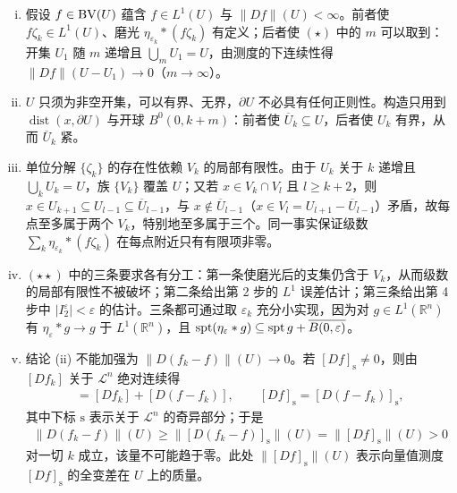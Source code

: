 \documentclass[../../main.tex]{subfiles}%
\begin{document}
\begin{remark}\label{remark:ch05-thm-5-3-条件}
\begin{enumerate}[(i)]
\item 假设 $f\in\mathrm{BV}(U)$ 蕴含 $f\in L^1(U)$ 与 $\lVert Df\rVert(U)<\infty$。前者使 $f\zeta_k\in L^1(U)$、磨光 $\eta_{\varepsilon_k}*(f\zeta_k)$ 有定义；后者使 $(\star)$ 中的 $m$ 可以取到：开集 $U_1$ 随 $m$ 递增且 $\bigcup_mU_1=U$，由测度的下连续性得 $\lVert Df\rVert(U-U_1)\to0$（$m\to\infty$）。
\item $U$ 只须为非空开集，可以有界、无界，$\partial U$ 不必具有任何正则性。构造只用到 $\operatorname{dist}(x,\partial U)$ 与开球 $B^0(0,k+m)$：前者使 $\overline{U}_k\subseteq U$，后者使 $U_k$ 有界，从而 $\overline{U}_k$ 紧。
\item 单位分解 $\{\zeta_k\}$ 的存在性依赖 $V_k$ 的局部有限性。由于 $U_k$ 关于 $k$ 递增且 $\bigcup_kU_k=U$，族 $\{V_k\}$ 覆盖 $U$；又若 $x\in V_k\cap V_l$ 且 $l\geqslant k+2$，则 $x\in U_{k+1}\subseteq U_{l-1}\subseteq\overline{U}_{l-1}$，与 $x\notin\overline{U}_{l-1}$（$x\in V_l=U_{l+1}-\overline{U}_{l-1}$）矛盾，故每点至多属于两个 $V_k$，特别地至多属于三个。同一事实保证级数 $\sum_k\eta_{\varepsilon_k}*(f\zeta_k)$ 在每点附近只有有限项非零。
\item $(\star\star)$ 中的三条要求各有分工：第一条使磨光后的支集仍含于 $V_k$，从而级数的局部有限性不被破坏；第二条给出第 2 步的 $L^1$ 误差估计；第三条给出第 4 步中 $\lvert I_2^{\varepsilon}\rvert<\varepsilon$ 的估计。三条都可通过取 $\varepsilon_k$ 充分小实现，因为对 $g\in L^1(\mathbb{R}^n)$ 有 $\eta_{\varepsilon}*g\to g$ 于 $L^1(\mathbb{R}^n)$，且 $\operatorname{spt}(\eta_{\varepsilon}*g)\subseteq\operatorname{spt} g+\overline{B(0,\varepsilon)}$。
\item 结论 (ii) 不能加强为 $\lVert D(f_k-f)\rVert(U)\to0$。若 $[Df]_{\mathrm{s}}\neq0$，则由 $[Df_k]$ 关于 $\mathcal{L}^n$ 绝对连续得
\begin{align*}
[Df]=[Df_k]+[D(f-f_k)],\qquad [Df]_{\mathrm{s}}=[D(f-f_k)]_{\mathrm{s}},
\end{align*}
其中下标 $\mathrm{s}$ 表示关于 $\mathcal{L}^n$ 的奇异部分；于是
\begin{align*}
\lVert D(f_k-f)\rVert(U)\geqslant\bigl\lVert[D(f_k-f)]_{\mathrm{s}}\bigr\rVert(U)=\bigl\lVert[Df]_{\mathrm{s}}\bigr\rVert(U)>0
\end{align*}
对一切 $k$ 成立，该量不可能趋于零。此处 $\lVert[Df]_{\mathrm{s}}\rVert(U)$ 表示向量值测度 $[Df]_{\mathrm{s}}$ 的全变差在 $U$ 上的质量。
\end{enumerate}
\end{remark}
\end{document}
